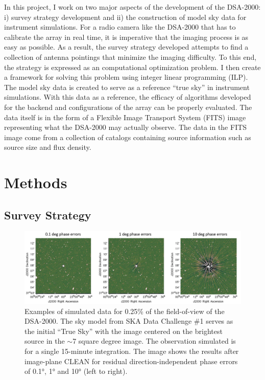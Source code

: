 \documentclass{article}
\begin{document}
\begin{multicols*}{2}
In this project, I work on two major aspects of the development of the DSA-2000: i) survey strategy development and ii) the construction of model sky data for instrument simulations. For a radio camera like the DSA-2000 that has to calibrate the array in real time, it is imperative that the imaging process is as easy  as possible. As a result, the survey strategy developed attempts to find a collection of antenna pointings that minimize the imaging difficulty. To this end, the strategy is expressed as an computational optimization problem. I then create a framework for solving this problem using integer linear programming (ILP). The model sky data is created to serve as a reference ``true sky'' in instrument simulations. With this data as a reference, the efficacy of algorithms developed for the backend and configurations of the array can be properly evaluated. The data itself is in the form of a Flexible Image Transport System (FITS) image representing what the DSA-2000 may actually observe. The data in the FITS image come from a collection of catalogs containing source information such as source size and flux density.




\section{Methods}
\subsection{Survey Strategy}

\begin{figure}
    \centering
    \includegraphics[scale=0.5]{images/artifacts.png}
    \caption{Examples of simulated data for 0.25\% of the field-of-view of the DSA-2000. The sky model from SKA Data Challenge \#1\cite{skadata1} serves as the initial ``True Sky'' with the image centered on the brightest source in the $\sim$7 square degree image. The observation simulated is for a single 15-minute integration. The image shows the results after image-plane CLEAN for residual direction-independent phase errors of 0.1°, 1° and 10° (left to right).}
    \label{fig:artifacts}
\end{figure}


\end{multicols*}
\end{document}

